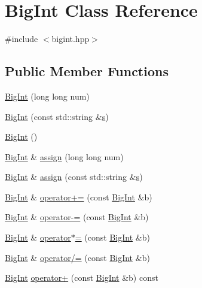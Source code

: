 \hypertarget{class_big_int}{}\section{Big\+Int Class Reference}
\label{class_big_int}


{\ttfamily \#include $<$bigint.\+hpp$>$}

\subsection*{Public Member Functions}
\begin{DoxyCompactItemize}
\item 
\hyperlink{class_big_int_a4421e6c1883874512f1b04543dafc64a}{Big\+Int} (long long num)
\item 
\hyperlink{class_big_int_abe13ffcbf871ddb97365a73120ca0b6f}{Big\+Int} (const std\+::string \&\hyperlink{preprocessortest_8cpp_a10d1ea193b80aa2128e080646057d11c}{s})
\item 
\hyperlink{class_big_int_af677021c0987fc2a48da06837ed29c58}{Big\+Int} ()
\item 
\hyperlink{class_big_int}{Big\+Int} \& \hyperlink{class_big_int_a43652944006a9ace4fa3d8e1c0ed3213}{assign} (long long num)
\item 
\hyperlink{class_big_int}{Big\+Int} \& \hyperlink{class_big_int_acc4942cf0af7096ec328735c75f8fcfe}{assign} (const std\+::string \&\hyperlink{preprocessortest_8cpp_a10d1ea193b80aa2128e080646057d11c}{s})
\item 
\hyperlink{class_big_int}{Big\+Int} \& \hyperlink{class_big_int_a5768b8d21f3cc80a85cdea09a8769a22}{operator+=} (const \hyperlink{class_big_int}{Big\+Int} \&b)
\item 
\hyperlink{class_big_int}{Big\+Int} \& \hyperlink{class_big_int_a164befb196d794282a927e1a490bb939}{operator-\/=} (const \hyperlink{class_big_int}{Big\+Int} \&b)
\item 
\hyperlink{class_big_int}{Big\+Int} \& \hyperlink{class_big_int_a8ac25b6a719f26833ad5550496c7a31d}{operator$\ast$=} (const \hyperlink{class_big_int}{Big\+Int} \&b)
\item 
\hyperlink{class_big_int}{Big\+Int} \& \hyperlink{class_big_int_aec211c9b6e6c0cc3c018ea31d63a0c16}{operator/=} (const \hyperlink{class_big_int}{Big\+Int} \&b)
\item 
\hyperlink{class_big_int}{Big\+Int} \hyperlink{class_big_int_a468c8997e2ec45ef37d5ff32becc5818}{operator+} (const \hyperlink{class_big_int}{Big\+Int} \&b) const 
\item 

\end{DoxyCompactItemize}
